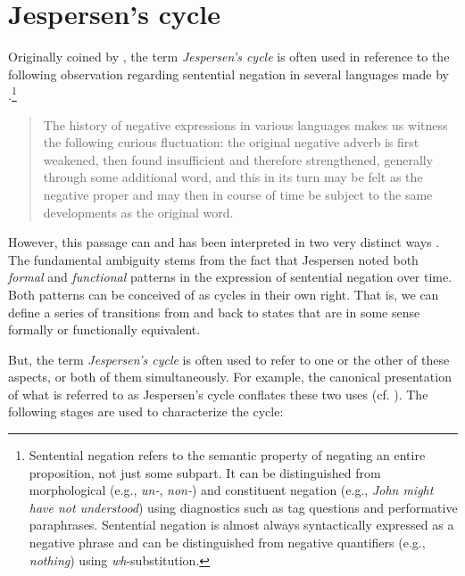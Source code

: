 \documentclass[linguex]{sp}
\theoremstyle{definition} \newtheorem{definition}{Definition}
\begin{document}
\section{Jespersen's cycle}
\label{Jespersen's cycle}


Originally coined by \citet[88]{dahl:1979}, the term \emph{Jespersen's cycle} is often used in reference to the following observation regarding sentential negation in several languages made by \citet[4]{jespersen:1917}.\footnote{Sentential negation refers to the semantic property of negating an entire proposition, not just some subpart. It can be distinguished from morphological (e.g., \emph{un-}, \emph{non-}) and constituent negation (e.g., \emph{John might have not understood}) using diagnostics such as tag questions and performative paraphrases. Sentential negation is almost always syntactically expressed as a negative phrase and can be distinguished from negative quantifiers (e.g., \emph{nothing}) using \emph{wh}-substitution.}

\begin{quote}
The history of negative expressions in various languages makes us witness the following curious fluctuation: the original negative adverb is first weakened, then found insufficient and therefore strengthened, generally through some additional word, and this in its turn may be felt as the negative proper and may then in course of time be subject to the same developments as the original word.
\end{quote}
However, this passage can and has been interpreted in two very distinct ways \citep{vanderAuwera2009}. The fundamental ambiguity stems from the fact that Jespersen noted both \emph{formal} and \emph{functional} patterns in the expression of sentential negation over time. Both patterns can be conceived of as cycles in their own right. That is, we can define a series of transitions from and back to states that are in some sense formally or functionally equivalent. 

But, the term \emph{Jespersen's cycle} is often used to refer to one or the other of these aspects, or both of them simultaneously. For example, the canonical presentation of what is referred to as Jespersen's cycle conflates these two uses (cf. \citealt{posner1985,schwegler1988,ladusaw1993}). The following stages are used to characterize the cycle:
\end{document}
